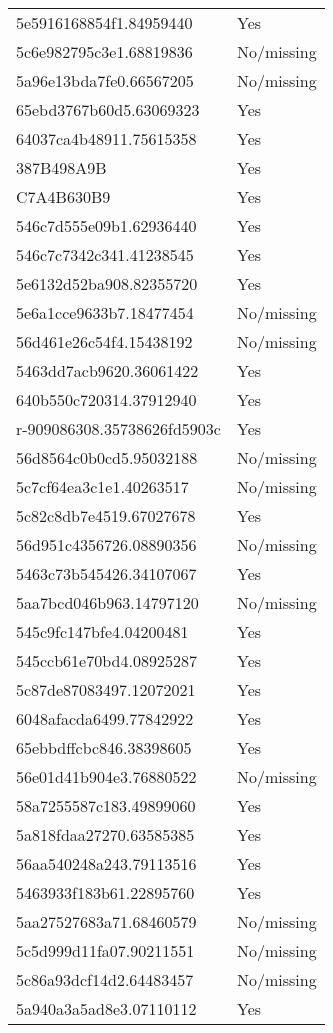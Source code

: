 \begin{tabular}{ll}
5e5916168854f1.84959440 & Yes \\
5c6e982795c3e1.68819836 & No/missing \\
5a96e13bda7fe0.66567205 & No/missing \\
65ebd3767b60d5.63069323 & Yes \\
64037ca4b48911.75615358 & Yes \\
387B498A9B & Yes \\
C7A4B630B9 & Yes \\
546c7d555e09b1.62936440 & Yes \\
546c7c7342c341.41238545 & Yes \\
5e6132d52ba908.82355720 & Yes \\
5e6a1cce9633b7.18477454 & No/missing \\
56d461e26c54f4.15438192 & No/missing \\
5463dd7acb9620.36061422 & Yes \\
640b550c720314.37912940 & Yes \\
r-909086308.35738626fd5903c & Yes \\
56d8564c0b0cd5.95032188 & No/missing \\
5c7cf64ea3c1e1.40263517 & No/missing \\
5c82c8db7e4519.67027678 & Yes \\
56d951c4356726.08890356 & No/missing \\
5463c73b545426.34107067 & Yes \\
5aa7bcd046b963.14797120 & No/missing \\
545c9fc147bfe4.04200481 & Yes \\
545ccb61e70bd4.08925287 & Yes \\
5c87de87083497.12072021 & Yes \\
6048afacda6499.77842922 & Yes \\
65ebbdffcbc846.38398605 & Yes \\
56e01d41b904e3.76880522 & No/missing \\
58a7255587c183.49899060 & Yes \\
5a818fdaa27270.63585385 & Yes \\
56aa540248a243.79113516 & Yes \\
5463933f183b61.22895760 & Yes \\
5aa27527683a71.68460579 & No/missing \\
5c5d999d11fa07.90211551 & No/missing \\
5c86a93dcf14d2.64483457 & No/missing \\
5a940a3a5ad8e3.07110112 & Yes \\

\end{tabular}

